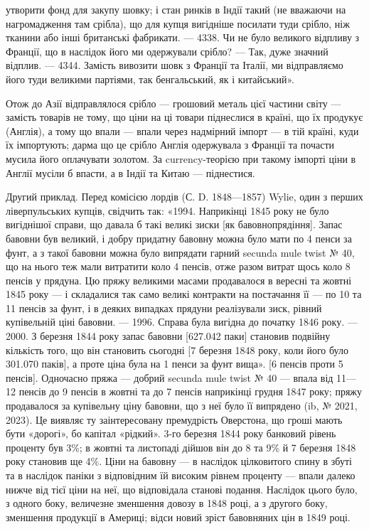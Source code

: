 \parcont{}  %
утворити фонд для закупу шовку; і стан ринків в Індії такий (не вважаючи на
нагромадження там срібла), що для купця вигідніше посилати туди срібло, ніж
тканини або інші британські фабрикати. — 4338. Чи не було великого відпливу
з Франції, що в наслідок його ми одержували срібло? — Так, дуже значний відплив.
— 4344. Замість вивозити шовк з Франції та Італії, ми відправляємо його
туди великими партіями, так бенгальський, як і китайський».

Отож до Азії відправлялося срібло — грошовий металь цієї частини світу —
замість товарів не тому, що ціни на ці товари піднеслися в країні, що їх продукує
(Англія), а тому що впали — впали через надмірний імпорт — в тій країні,
куди їх імпортують; дарма що це срібло Англія одержувала з Франції та почасти
мусила його оплачувати золотом. За currency-теорією при такому імпорті
ціни в Англії мусіли б впасти, а в Індії та Китаю — піднестися.

Другий приклад. Перед комісією лордів (С. D. 1848—1857) Wylie, один
з    перших ліверпульських купців, свідчить так: «1994. Наприкінці 1845 року
не було вигіднішої справи, що давала б такі великі зиски [як бавовнопрядіння].
Запас бавовни був великий, і добру придатну бавовну можна було мати по
4    пенси за фунт, а з такої бавовни можна було випрядати гарний secunda
mule twist № 40, що на нього теж мали витратити коло 4 пенсів, отже разом
витрат щось коло 8 пенсів у прядуна. Цю пряжу великими масами продавалося
в вересні та жовтні 1845 року — і складалися так само великі контракти на
постачання її — по 10 та 11 пенсів за фунт, і в деяких випадках прядуни
реалізували зиск, рівний купівельній ціні бавовни. — 1996. Справа була вигідна
до початку 1846 року. — 2000. З березня 1844 року запас бавовни [627.042 паки]
становив подвійну кількість того, що він становить сьогодні [7 березня 1848 року,
коли його було 301.070 паків], а проте ціна була на 1 пенси за фунт вища».
[6 пенсів проти 5 пенсів]. Одночасно пряжа — добрий secunda mule twist
№ 40 — впала від 11—12 пенсів до 9 пенсів в жовтні та до 7 пенсів
наприкінці грудня 1847 року; пряжу продавалося за купівельну ціну бавовни,
що з неї було її випрядено (ib, № 2021, 2023). Це виявляє ту заінтересовану
премудрість Оверстона, що гроші мають бути «дорогі», бо капітал «рідкий». 3-го березня
1844 року банковий рівень проценту був 3\%; в жовтні та листопаді
дійшов він до 8 та 9\% й 7 березня 1848 року становив ще 4\%. Ціни на бавовну
— в наслідок цілковитого спину в збуті та в наслідок паніки з відповідним
їй високим рівнем проценту — впали далеко нижче від тієї ціни на неї,
що відповідала станові подання. Наслідок цього було, з одного боку, величезне
зменшення довозу в 1848 році, а з другого боку, зменшення продукції в Америці;
відси новий зріст бавовняних цін в 1849 році.

